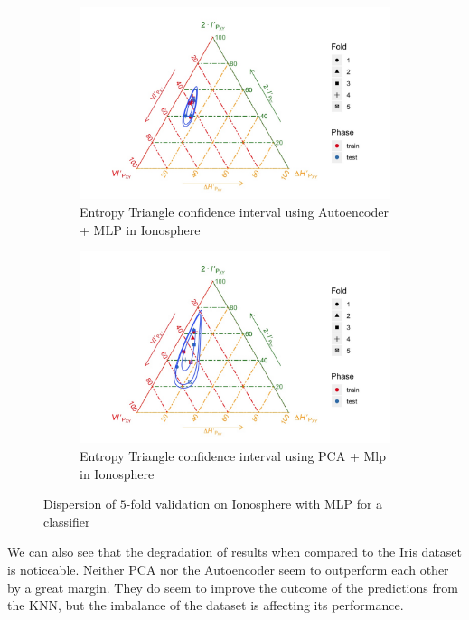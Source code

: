 \begin{figure}
\begin{subfigure}{\textwidth}  
	\centering
	\includegraphics[width=\linewidth]{Figuras_tfg/ET_Iono_Auto_Mlp_Confidence}
	\caption{Entropy Triangle confidence interval using Autoencoder + MLP in Ionosphere}
	\label{fig:figure_Mlp_Iono_ET_Auto_Confidence}
\end{subfigure}

\begin{subfigure}{\textwidth}  
	\centering
	\includegraphics[width=\linewidth]{Figuras_tfg/ET_Iono_PCA_Mlp_Confidence}
	\caption{Entropy Triangle confidence interval using PCA + Mlp in Ionosphere}
	\label{fig:figure_Mlp_Iono_ET_PCA_Confidence}
\end{subfigure}
\caption{Dispersion of $5$-fold validation on Ionosphere with MLP for a classifier}
\label{fig:figure_Mlp_Iono_Confidence}
\end{figure}


 We can also see that the degradation of results when compared to the Iris dataset is noticeable. Neither  PCA nor the Autoencoder  seem to outperform each other by a great margin. They do seem to improve the outcome of the predictions from the KNN, but the imbalance of the dataset is affecting its performance. \par


